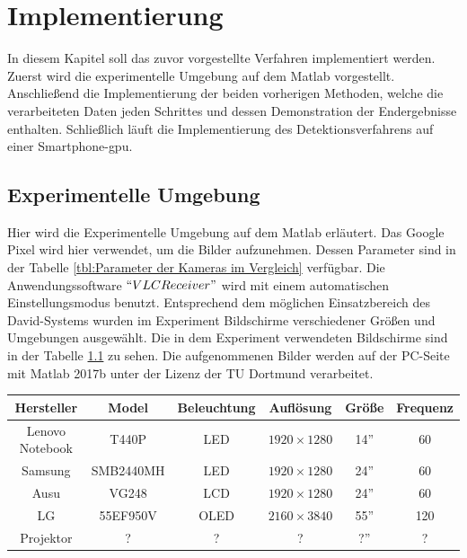 \chapter{Implementierung} \label{cha:Implementierung}

In diesem Kapitel soll das zuvor vorgestellte Verfahren implementiert werden. Zuerst wird die experimentelle Umgebung auf dem Matlab vorgestellt. Anschließend die Implementierung der beiden vorherigen Methoden, welche die verarbeiteten Daten jeden Schrittes und dessen Demonstration der Endergebnisse enthalten. Schließlich läuft die Implementierung des Detektionsverfahrens auf einer Smartphone-\gls{gpu}.

\section{Experimentelle Umgebung}

Hier wird die Experimentelle Umgebung auf dem Matlab erläutert. Das Google Pixel wird hier verwendet, um die Bilder aufzunehmen. Dessen Parameter sind in der Tabelle \ref{tbl:Parameter der Kameras im Vergleich} verfügbar. Die Anwendungssoftware $ ``VLCReceiver" $ wird mit einem automatischen Einstellungsmodus benutzt. Entsprechend dem möglichen Einsatzbereich des David-Systems wurden im Experiment Bildschirme verschiedener Größen und Umgebungen ausgewählt. Die in dem Experiment verwendeten Bildschirme sind in der Tabelle \ref{tbl:Verwendeter Bildschirm} zu sehen. Die aufgenommenen Bilder werden auf der PC-Seite mit Matlab 2017b unter der Lizenz der TU Dortmund verarbeitet.

\begin{table}[htb]
	\label{tbl:Verwendeter Bildschirm}
	\footnotesize
	\centering
	\begin{tabular}{|c|c|c|c|c|c|}
	\toprule
	\textbf{Hersteller} & \textbf{Model} & \textbf{Beleuchtung} & \textbf{Auflösung} & \textbf{Größe}	& \textbf{Frequenz}\\
	\midrule
	Lenovo Notebook & T440P & LED & $ 1920 \times 1280$ & 14'' & 60 \\
	Samsung 	  & SMB2440MH   & LED & $ 1920 \times 1280$ & 24'' & 60 \\
	Ausu  		  & VG248   & LCD & $ 1920 \times 1280$ & 24'' & 60 \\
	LG  		  & 55EF950V & OLED & $ 2160 \times 3840$ & 55'' & 120 \\
	 Projektor & ? & ? & ? & ?'' & ? \\
	
	\bottomrule
	\end{tabular}
\end{table} 


